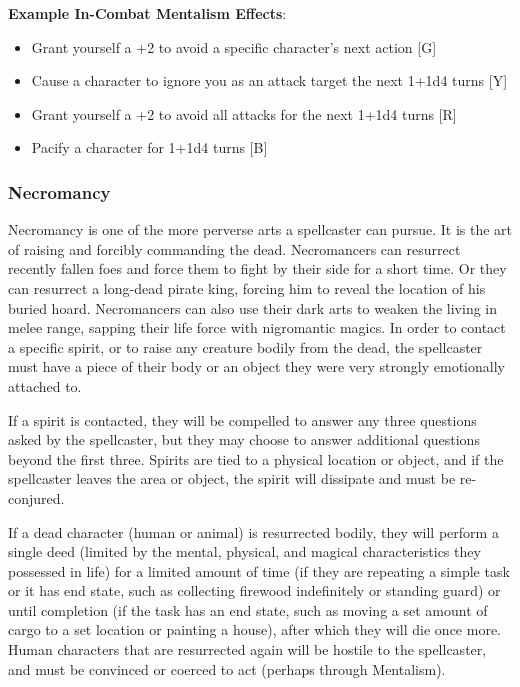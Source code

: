 \documentclass[oneside]{book}
\begin{document}
\begin{multicols}{2}
\textbf{Example In-Combat Mentalism Effects}:
	\begin{itemize}
		\setlength{\itemsep}{0cm}%
  		\setlength{\parskip}{0cm}%
		\item{ \small Grant yourself a +2 to avoid a specific character's next action [G]}
		\item{ \small Cause a character to ignore you as an attack target the next 1+1d4 turns [Y]}
		\item{ \small Grant yourself a +2 to avoid all attacks for the next 1+1d4 turns [R]}
		\item{ \small Pacify a character for 1+1d4 turns [B]}
	\end{itemize}
	
	
\subsubsection{Necromancy}
Necromancy is one of the more perverse arts a spellcaster can pursue. It is the art of raising and forcibly commanding the dead. Necromancers can resurrect recently fallen foes and force them to fight by their side for a short time. Or they can resurrect a long-dead pirate king, forcing him to reveal the location of his buried hoard. Necromancers can also use their dark arts to weaken the living in melee range, sapping their life force with nigromantic magics. In order to contact a specific spirit, or to raise any creature bodily from the dead, the spellcaster must have a piece of their body or an object they were very strongly emotionally attached to.

If a spirit is contacted, they will be compelled to answer any three questions asked by the spellcaster, but they may choose to answer additional questions beyond the first three. Spirits are tied to a physical location or object, and if the spellcaster leaves the area or object, the spirit will dissipate and must be re-conjured.
 
If a dead character (human or animal) is resurrected bodily, they will perform a single deed (limited by the mental, physical, and magical characteristics they possessed in life) for a limited amount of time (if they are repeating a simple task or it has end state, such as collecting firewood indefinitely or standing guard) or until completion (if the task has an end state, such as moving a set amount of cargo to a set location or painting a house), after which they will die once more. Human characters that are resurrected again will be hostile to the spellcaster, and must be convinced or coerced to act (perhaps through Mentalism). 


\end{multicols}
\end{document}
